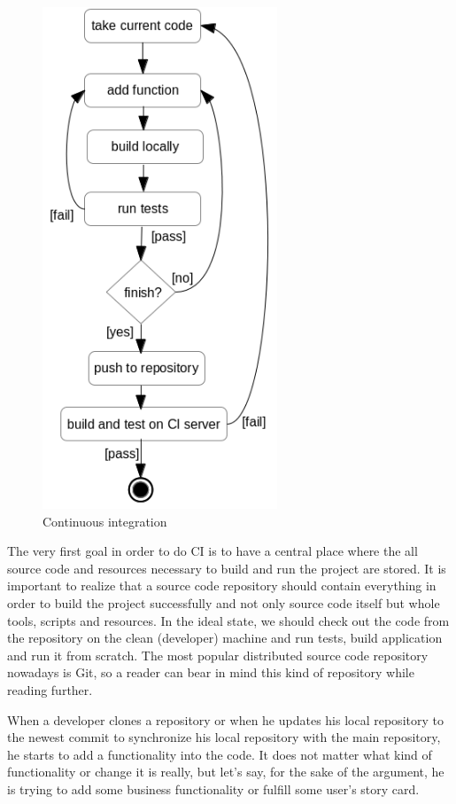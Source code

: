 \documentclass[12pt,final,oneside]{fithesis}
\begin{document}
\begin{figure}
	\centering
	\includegraphics[width=70mm]{img/ci.png}
	\caption{Continuous integration}
	\label{fig:ci_process}
\end{figure}

\newpage

The very first goal in order to do CI is to have a central place where the all source code and resources necessary to build and run the project are stored. It is important to realize that a source code repository should contain everything in order to build the project successfully and not only source code itself but whole tools, scripts and resources. In the ideal state, we should check out the code from the repository on the clean (developer) machine and run tests, build application and run it from scratch. The most popular distributed source code repository nowadays is Git, so a reader can bear in mind this kind of repository while reading further.

When a developer clones a repository or when he updates his local repository to the newest commit to synchronize his local repository with the main repository, he starts to add a functionality into the code. It does not matter what kind of functionality or change it is really, but let's say, for the sake of the argument, he is trying to add some business functionality or fulfill some user's story card.
\end{document}
